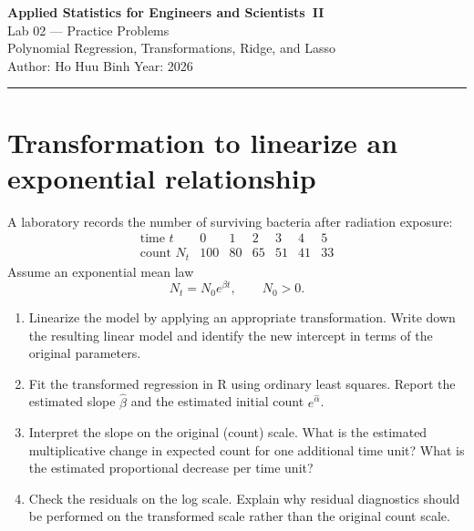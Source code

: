 \documentclass[12pt,a4paper]{article}
\begin{document}
\begin{center}
  {\LARGE\bfseries Applied Statistics for Engineers and Scientists~II}\\[6pt]
  {\Large Lab 02 --- Practice Problems}\\[4pt]
  {\large Polynomial Regression, Transformations, Ridge, and Lasso}\\[8pt]
  {\normalsize Author: Ho Huu Binh \hspace{2em} Year: 2026}
\end{center}

\bigskip
\hrule
\bigskip

\section{Transformation to linearize an exponential relationship}

A laboratory records the number of surviving bacteria after radiation exposure:
$$
\begin{array}{c|cccccc}
\text{time }t & 0 & 1 & 2 & 3 & 4 & 5\\
\hline
\text{count }N_t & 100 & 80 & 65 & 51 & 41 & 33
\end{array}
$$
Assume an exponential mean law
$$
  N_t = N_0 e^{\beta t},
  \qquad N_0 > 0.
$$

\begin{enumerate}[label=(\alph*)]
  \item Linearize the model by applying an appropriate transformation.
        Write down the resulting linear model and identify the new intercept
        in terms of the original parameters.

  \item Fit the transformed regression in R using ordinary least squares.
        Report the estimated slope $\widehat\beta$ and the estimated initial
        count $e^{\widehat\alpha}$.

  \item Interpret the slope on the original (count) scale.
        What is the estimated multiplicative change in expected count for one
        additional time unit? What is the estimated proportional decrease per
        time unit?

  \item Check the residuals on the log scale.
        Explain why residual diagnostics should be performed on the
        transformed scale rather than the original count scale.
\end{enumerate}
\end{document}
